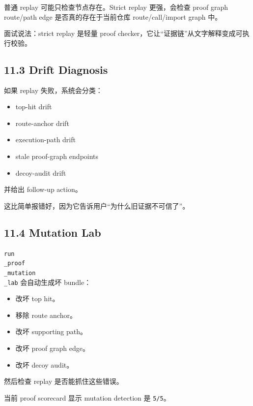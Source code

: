 \documentclass[UTF8,12pt,openany]{ctexbook}
\begin{document}
普通 replay 可能只检查节点存在。Strict replay 更强，会检查 proof graph route/path edge 是否真的存在于当前仓库 route/call/import graph 中。\par

面试说法：strict replay 是轻量 proof checker，它让“证据链”从文字解释变成可执行校验。\par

\subsection{11.3 Drift Diagnosis}

如果 replay 失败，系统会分类：\par

\begin{itemize}
\item top-hit drift
\item route-anchor drift
\item execution-path drift
\item stale proof-graph endpoints
\item decoy-audit drift
\end{itemize}

并给出 follow-up action。\par

这比简单报错好，因为它告诉用户“为什么旧证据不可信了”。\par

\subsection{11.4 Mutation Lab}

\texttt{run\\_proof\\_mutation\\_lab} 会自动生成坏 bundle：\par

\begin{itemize}
\item 改坏 top hit。
\item 移除 route anchor。
\item 改坏 supporting path。
\item 改坏 proof graph edge。
\item 改坏 decoy audit。
\end{itemize}

然后检查 replay 是否能抓住这些错误。\par

当前 proof scorecard 显示 mutation detection 是 \texttt{5/5}。\par
\end{document}
